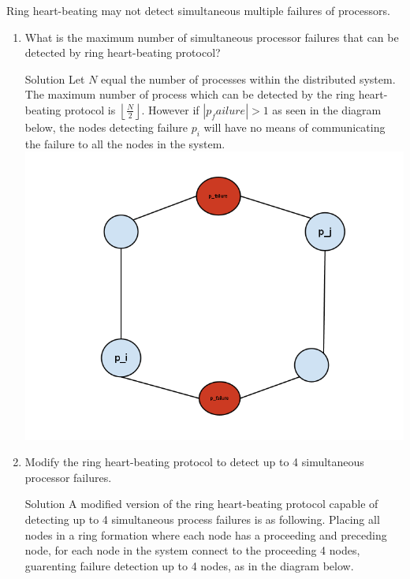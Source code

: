 \documentclass{article}
\begin{document}
\begin{spacing}{1.1}
\maketitle
\newpage
\begin{homeworkProblem}
	Ring heart-beating may not detect simultaneous multiple failures of processors.
	\begin{enumerate}[(1)]
		\item What is the maximum number of simultaneous processor failures that can be detected by ring heart-beating protocol?
			\begin{homeworkSection}{Solution}
				Let $N$ equal the number of processes within the distributed system.  The maximum number of process which can be detected by the ring heart-beating protocol is $\left\lfloor {\frac{N}{2}} \right\rfloor$.   However if $\left|p_failure \right| > 1$ as seen in the diagram below, the nodes detecting failure $p_i$ will have no means of communicating the failure to all the nodes in the system.  
				\\ \includegraphics[width=\linewidth]{prob1Aans.png}
			\end{homeworkSection}
		\item Modify the ring heart-beating protocol to detect up to 4 simultaneous processor failures.  
			\begin{homeworkSection}{Solution}
				A modified version of the ring heart-beating protocol capable of detecting up to 4 simultaneous process failures is as following.  Placing all nodes in a ring formation where each node has a proceeding and preceding node, for each node in the system connect to the proceeding 4 nodes, guarenting failure detection up to 4 nodes, as in the diagram below.  

\end{homeworkSection}
\end{enumerate}
\end{homeworkProblem}
\end{spacing}
\end{document}
